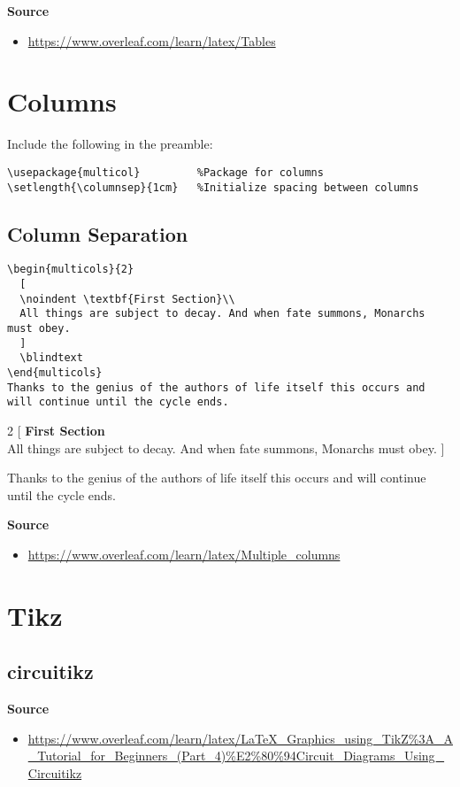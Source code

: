\documentclass[10pt, letterpaper]{article}
\begin{document}
\noindent\textbf{Source}
\begin{itemize}
  \item \url{https://www.overleaf.com/learn/latex/Tables}
\end{itemize}


\section{Columns}
Include the following in the preamble:
\lstset{style=basicstyle}
\begin{lstlisting}[title=Preamble]
\usepackage{multicol}         %Package for columns
\setlength{\columnsep}{1cm}   %Initialize spacing between columns
\end{lstlisting}

\subsection{Column Separation}
\begin{lstlisting}[]
\begin{multicols}{2}
  [
  \noindent \textbf{First Section}\\
  All things are subject to decay. And when fate summons, Monarchs must obey.
  ]
  \blindtext
\end{multicols}
Thanks to the genius of the authors of life itself this occurs and will continue until the cycle ends.
\end{lstlisting}

\begin{multicols}{2}
  [
  \noindent \textbf{First Section}\\
  All things are subject to decay. And when fate summons, Monarchs must obey.
  ]
  \blindtext
\end{multicols}
Thanks to the genius of the authors of life itself this occurs and will continue until the cycle ends.

\noindent\textbf{Source}
\begin{itemize}
  \item \url{https://www.overleaf.com/learn/latex/Multiple_columns}
\end{itemize}

\section{Tikz}
\subsection{circuitikz}
\textbf{Source}
\begin{itemize}
  \item \url{https://www.overleaf.com/learn/latex/LaTeX_Graphics_using_TikZ%3A_A_Tutorial_for_Beginners_(Part_4)%E2%80%94Circuit_Diagrams_Using_Circuitikz}
\end{itemize}
\end{document}

